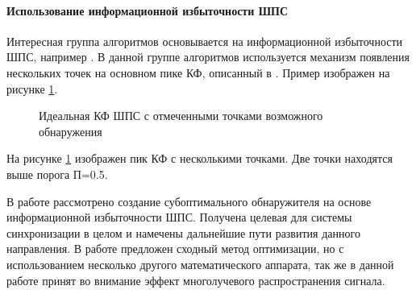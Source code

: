 \paragraph{Использование информационной избыточности ШПС}
Интересная группа алгоритмов основывается на информационной избыточности ШПС, например \cite{phd_che, article_tcd}. В данной
группе алгоритмов используется механизм появления нескольких точек на основном пике КФ, описанный в \cite{kaplan}. Пример
изображен на рисунке \ref{pic:sec1_peak_tcd}.

\begin{figure}[H]
	\center{}
	\caption{Идеальная КФ ШПС с отмеченными точками возможного обнаружения}
	\label{pic:sec1_peak_tcd}
\end{figure}

На рисунке \ref{pic:sec1_peak_tcd} изображен пик КФ с несколькими точками. Две точки находятся выше порога П=0.5.

В работе \cite{phd_che} рассмотрено создание субоптимального обнаружителя на основе информационной избыточности ШПС.
Получена целевая для системы синхронизации в целом и намечены дальнейшие пути развития данного направления.
В работе \cite{article_tcd} предложен сходный метод оптимизации, но с использованием несколько другого математического
аппарата, так же в данной работе принят во внимание эффект многолучевого распространения сигнала.

